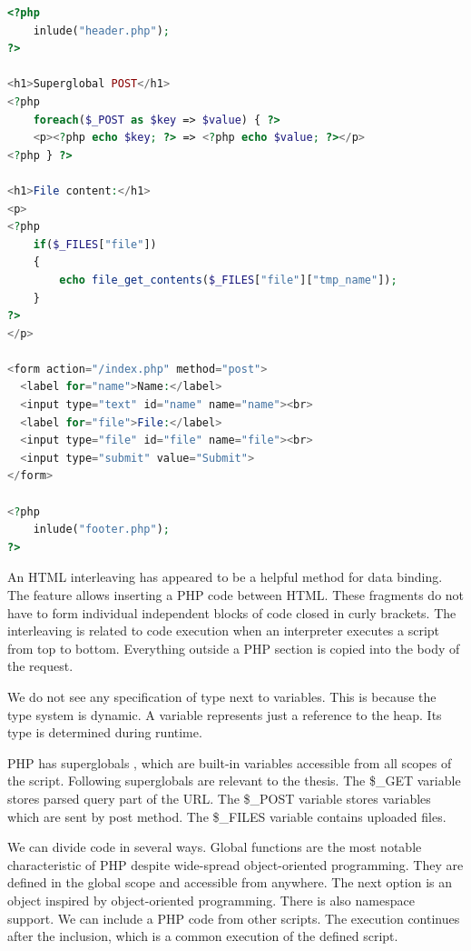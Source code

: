 \begin{minipage}[c]{0.95\textwidth}
\begin{lstlisting}[basicstyle=\small, caption=A PHP code.,
  language=PHP, label={lst:PHP}]
<?php
    inlude("header.php");
?>

<h1>Superglobal POST</h1>
<?php
	foreach($_POST as $key => $value) { ?>
	<p><?php echo $key; ?> => <?php echo $value; ?></p>
<?php } ?>

<h1>File content:</h1>
<p>
<?php 
	if($_FILES["file"])
	{
		echo file_get_contents($_FILES["file"]["tmp_name"]);
	}	
?>
</p>

<form action="/index.php" method="post">
  <label for="name">Name:</label>
  <input type="text" id="name" name="name"><br>
  <label for="file">File:</label>
  <input type="file" id="file" name="file"><br>
  <input type="submit" value="Submit">
</form>

<?php
    inlude("footer.php");
?>
\end{lstlisting}
\end{minipage}
\par
An HTML interleaving has appeared to be a helpful method for data binding.
The feature allows inserting a PHP code between HTML.
These fragments do not have to form individual independent blocks of code closed in curly brackets.
The interleaving is related to code execution when an interpreter executes a script from top to bottom. Everything outside a PHP section is copied into the body of the request.
\par
We do not see any specification of type next to variables.
This is because the type system is dynamic.
A variable represents just a reference to the heap.
Its type is determined during runtime. 
\par
PHP has superglobals , which are built-in variables accessible from all scopes of the script.
Following superglobals are relevant to the thesis.
The \$\_GET variable stores parsed query part of the URL.
The \$\_POST variable stores variables which are sent by post method.
The \$\_FILES variable contains uploaded files.
\par
{}
We can divide code in several ways.
Global functions are the most notable characteristic of PHP despite wide-spread object-oriented programming.
They are defined in the global scope and accessible from anywhere.
The next option is an object inspired by object-oriented programming.
There is also namespace support.
We can include a PHP code from other scripts. 
The execution continues after the inclusion, which is a common execution of the defined script.
